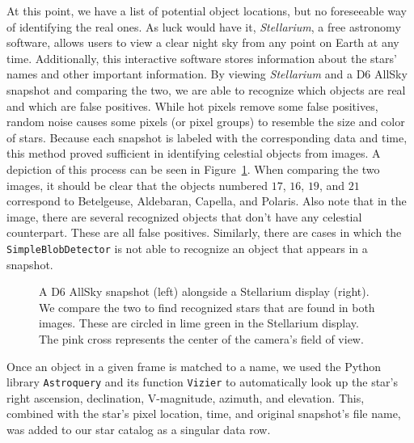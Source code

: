 At this point, we have a list of potential object locations, but no foreseeable way of identifying the real ones.
As luck would have it, \textit{Stellarium}, a free astronomy software, allows users to view a clear night sky from any point on Earth at any time.
Additionally, this interactive software stores information about the stars' names and other important information.
By viewing \textit{Stellarium} and a D6 AllSky snapshot and comparing the two, we are able to recognize which objects are real and which are false positives.
While hot pixels remove some false positives, random noise causes some pixels (or pixel groups) to resemble the size and color of stars.
Because each snapshot is labeled with the corresponding data and time, this method proved sufficient in identifying celestial objects from images.
A depiction of this process can be seen in Figure~\ref{star_recognition}.  
When comparing the two images, it should be clear that the objects numbered $17$, $16$, $19$, and $21$ correspond to Betelgeuse, Aldebaran, Capella, and Polaris. 
Also note that in the image, there are several recognized objects that don't have any celestial counterpart.
These are all false positives.
Similarly, there are cases in which the \texttt{SimpleBlobDetector} is not able to recognize an object that appears in a snapshot.

\begin{figure}[h]
  \caption{A D6 AllSky snapshot (left) alongside a Stellarium display (right).  We compare the two to find recognized stars that are found in both images.  These are circled in lime green in the Stellarium display.  The pink cross represents the center of the camera's field of view. }
  \label{star_recognition}
\end{figure}


Once an object in a given frame is matched to a name, we used the Python library \texttt{Astroquery} and its function \texttt{Vizier} to automatically look up the star's right ascension, declination, V-magnitude, azimuth, and elevation.  
This, combined with the star's pixel location, time, and original snapshot's file name, was added to our star catalog as a singular data row.


